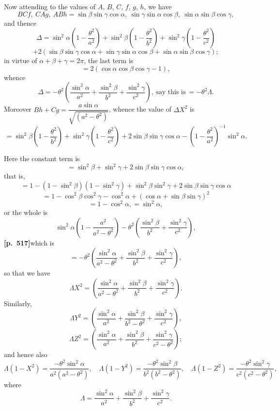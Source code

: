 \documentclass[11pt,a4paper]{article}
\begin{document}
Now attending to the values of $A$, $B$, $C$, $f$, $g$, $h$, we have
\[
BCf,\ CAg,\ ABh = \sin\beta\sin\gamma\cos\alpha,\ \sin\gamma\sin\alpha\cos\beta,\ \sin\alpha\sin\beta\cos\gamma,
\]
and thence
\[
\Delta = \sin^{2}\alpha\left(1 - \frac{\theta^{2}}{a^{2}}\right) + \sin^{2}\beta\left(1 - \frac{\theta^{2}}{b^{2}}\right) + \sin^{2}\gamma\left(1 - \frac{\theta^{2}}{c^{2}}\right)
\]
\[
+ 2(\sin\beta\sin\gamma\cos\alpha + \sin\gamma\sin\alpha\cos\beta + \sin\alpha\sin\beta\cos\gamma);
\]
in virtue of $\alpha + \beta + \gamma = 2\pi$, the last term is
\[
= 2(\cos\alpha\cos\beta\cos\gamma - 1),
\]
whence
\[
\Delta = -\theta^{2}\left(\frac{\sin^{2}\alpha}{a^{2}} + \frac{\sin^{2}\beta}{b^{2}} + \frac{\sin^{2}\gamma}{c^{2}}\right),\ \text{say this is}\ = -\theta^{2}\Lambda.
\]
Moreover $Bh + Cg = \dfrac{a\sin\alpha}{\sqrt{(a^{2} - \theta^{2})}}$, whence the value of $\Delta X^{2}$ is
\[
= \sin^{2}\beta\left(1 - \frac{\theta^{2}}{b^{2}}\right) + \sin^{2}\gamma\left(1 - \frac{\theta^{2}}{c^{2}}\right) + 2\sin\beta\sin\gamma\cos\alpha - \left(1 - \frac{\theta^{2}}{a^{2}}\right)^{-1}\sin^{2}\alpha.
\]

Here the constant term is
\[
= \sin^{2}\beta + \sin^{2}\gamma + 2\sin\beta\sin\gamma\cos\alpha,
\]
that is,
\[
= 1 - (1 - \sin^{2}\beta)(1 - \sin^{2}\gamma) + \sin^{2}\beta\sin^{2}\gamma + 2\sin\beta\sin\gamma\cos\alpha
\]
\[
= 1 - \cos^{2}\beta\cos^{2}\gamma - \cos^{2}\alpha + (\cos\alpha + \sin\beta\sin\gamma)^{2}
\]
\[
= 1 - \cos^{2}\alpha, = \sin^{2}\alpha,
\]
or the whole is
\[
\sin^{2}\alpha\left(1 - \frac{a^{2}}{a^{2} - \theta^{2}}\right) - \theta^{2}\left(\frac{\sin^{2}\beta}{b^{2}} + \frac{\sin^{2}\gamma}{c^{2}}\right),
\]
\noindent\textbf{[p.~517]}\quad which is
\[
= -\theta^{2}\left(\frac{\sin^{2}\alpha}{a^{2} - \theta^{2}} + \frac{\sin^{2}\beta}{b^{2}} + \frac{\sin^{2}\gamma}{c^{2}}\right),
\]
so that we have
\[
\Lambda X^{2} = \left(\frac{\sin^{2}\alpha}{a^{2} - \theta^{2}} + \frac{\sin^{2}\beta}{b^{2}} + \frac{\sin^{2}\gamma}{c^{2}}\right).
\]
Similarly,
\[
\Lambda Y^{2} = \left(\frac{\sin^{2}\alpha}{a^{2}} + \frac{\sin^{2}\beta}{b^{2} - \theta^{2}} + \frac{\sin^{2}\gamma}{c^{2}}\right),
\]
\[
\Lambda Z^{2} = \left(\frac{\sin^{2}\alpha}{a^{2}} + \frac{\sin^{2}\beta}{b^{2}} + \frac{\sin^{2}\gamma}{c^{2} - \theta^{2}}\right);
\]
and hence also
\[
\Lambda(1 - X^{2}) = \frac{-\theta^{2}\sin^{2}\alpha}{a^{2}(a^{2} - \theta^{2})},\quad \Lambda(1 - Y^{2}) = \frac{-\theta^{2}\sin^{2}\beta}{b^{2}(b^{2} - \theta^{2})},\quad \Lambda(1 - Z^{2}) = \frac{-\theta^{2}\sin^{2}\gamma}{c^{2}(c^{2} - \theta^{2})},
\]
where
\[
\Lambda = \frac{\sin^{2}\alpha}{a^{2}} + \frac{\sin^{2}\beta}{b^{2}} + \frac{\sin^{2}\gamma}{c^{2}}.
\]
\end{document}
